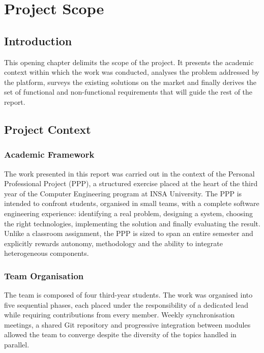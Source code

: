 \documentclass[12pt,a4paper,oneside]{book}
\begin{document}
{{%
\chapter{Project Scope}
\label{ch:scope}
\section*{Introduction}
This opening chapter delimits the scope of the project. It presents the
academic context within which the work was conducted, analyses the problem
addressed by the platform, surveys the existing solutions on the market and
finally derives the set of functional and non-functional requirements that
will guide the rest of the report.

\section{Project Context}

\subsection{Academic Framework}

The work presented in this report was carried out in the context of the
Personal Professional Project (PPP), a structured exercise placed at the
heart of the third year of the Computer Engineering program at INSA
University. The PPP is intended to confront students, organised in small
teams, with a complete software engineering experience: identifying a real
problem, designing a system, choosing the right technologies, implementing
the solution and finally evaluating the result. Unlike a classroom assignment,
the PPP is sized to span an entire semester and explicitly rewards autonomy,
methodology and the ability to integrate heterogeneous components.

\subsection{Team Organisation}

The team is composed of four third-year students. The work was organised
into five sequential phases, each placed under the responsibility of a
dedicated lead while requiring contributions from every member. Weekly
synchronisation meetings, a shared Git repository and progressive integration
between modules allowed the team to converge despite the diversity of the
topics handled in parallel.

}}
\end{document}
